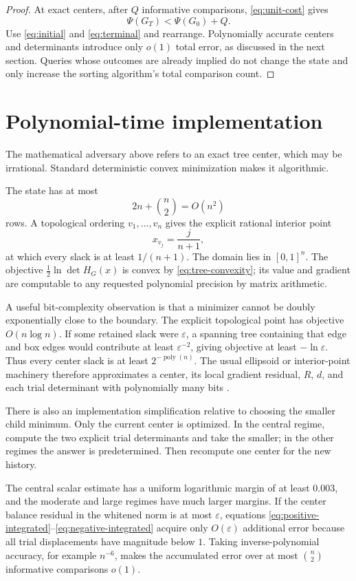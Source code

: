 \documentclass[11pt]{article}
\theoremstyle{definition}
\newcommand{\1}{\mathbf{1}}
\begin{document}
\begin{proof}
At exact centers, after $Q$ informative comparisons, \eqref{eq:unit-cost} gives
\[
\Psi(G_T)<\Psi(G_0)+Q.
\]
Use \eqref{eq:initial} and \eqref{eq:terminal} and rearrange.  Polynomially accurate centers and determinants introduce only $o(1)$ total error, as discussed in the next section.  Queries whose outcomes are already implied do not change the state and only increase the sorting algorithm's total comparison count.
\end{proof}

\section{Polynomial-time implementation}

The mathematical adversary above refers to an exact tree center, which may be irrational.  Standard deterministic convex minimization makes it algorithmic.

The state has at most
\[
2n+\binom n2=O(n^2)
\]
rows.  A topological ordering $v_1,\ldots,v_n$ gives the explicit rational interior point
\[
x_{v_j}=\frac{j}{n+1},
\]
at which every slack is at least $1/(n+1)$.  The domain lies in $[0,1]^n$.  The objective $\frac12\ln\det H_G(x)$ is convex by \eqref{eq:tree-convexity}; its value and gradient are computable to any requested polynomial precision by matrix arithmetic.

A useful bit-complexity observation is that a minimizer cannot be doubly exponentially close to the boundary.  The explicit topological point has objective $O(n\log n)$.  If some retained slack were $\varepsilon$, a spanning tree containing that edge and box edges would contribute at least $\varepsilon^{-2}$, giving objective at least $-\ln\varepsilon$.  Thus every center slack is at least $2^{-\operatorname{poly}(n)}$.  The usual ellipsoid or interior-point machinery therefore approximates a center, its local gradient residual, $R$, $d$, and each trial determinant with polynomially many bits \cite{Vaidya1996,NashCurvature2026}.

There is also an implementation simplification relative to choosing the smaller child minimum.  Only the current center is optimized.  In the central regime, compute the two explicit trial determinants and take the smaller; in the other regimes the answer is predetermined.  Then recompute one center for the new history.

The central scalar estimate has a uniform logarithmic margin of at least $0.003$, and the moderate and large regimes have much larger margins.  If the center balance residual in the whitened norm is at most $\varepsilon$, equations \eqref{eq:positive-integrated}--\eqref{eq:negative-integrated} acquire only $O(\varepsilon)$ additional error because all trial displacements have magnitude below $1$.  Taking inverse-polynomial accuracy, for example $n^{-6}$, makes the accumulated error over at most $\binom n2$ informative comparisons $o(1)$.
\end{document}
